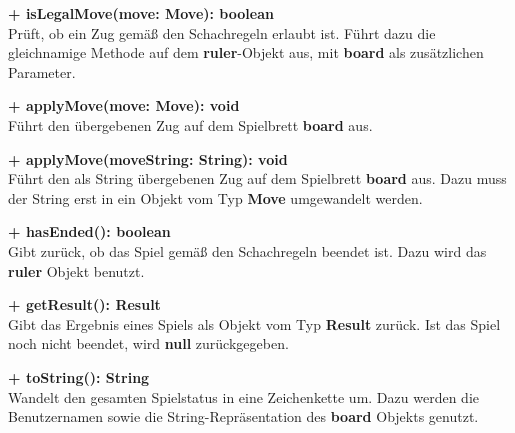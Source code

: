 \documentclass[parskip=full]{scrartcl}
\begin{document}
\begin{description}
					\item \textbf{+ isLegalMove(move: Move): boolean}\\ Prüft, ob ein Zug gemäß den Schachregeln erlaubt ist. Führt dazu die gleichnamige Methode auf dem \textbf{ruler}-Objekt aus, mit \textbf{board} als zusätzlichen Parameter.
					\item \textbf{+ applyMove(move: Move): void}\\ Führt den übergebenen Zug auf dem Spielbrett \textbf{board} aus.
					\item \textbf{+ applyMove(moveString: String): void}\\ Führt den als String übergebenen Zug auf dem Spielbrett \textbf{board} aus. Dazu muss der String erst in ein Objekt vom Typ \textbf{Move} umgewandelt werden.
					\item \textbf{+ hasEnded(): boolean}\\ Gibt zurück, ob das Spiel gemäß den Schachregeln beendet ist. Dazu wird das \textbf{ruler} Objekt benutzt.
					\item \textbf{+ getResult(): Result}\\ Gibt das Ergebnis eines Spiels als Objekt vom Typ \textbf{Result} zurück. Ist das Spiel noch nicht beendet, wird \textbf{null} zurückgegeben.
					\item \textbf{+ toString(): String}\\ Wandelt den gesamten Spielstatus in eine Zeichenkette um. Dazu werden die Benutzernamen sowie die String-Repräsentation des \textbf{board} Objekts genutzt.
				\end{description}
			
			
		\newpage
		
\end{document}
